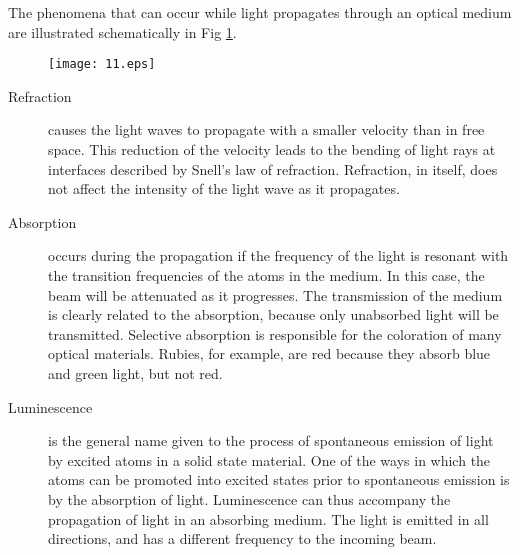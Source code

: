\documentclass[12pt]{book}
\begin{document}
The phenomena that can occur while light propagates through an optical medium are illustrated schematically in Fig \ref{fig:sche}.

\begin{figure}[http]
\begin{center}\label{fig:sche}
\texttt{[image: 11.eps]}
\end{center}
\end{figure}
\vspace{-3\baselineskip}


\vspace{2\baselineskip}
\begin{description}
\item[Refraction] causes the light waves to propagate with a smaller velocity than in free space. This reduction of the velocity leads to the bending of light rays at interfaces described by Snell's law of refraction. Refraction, in itself, does not affect the intensity of the light wave as it propagates.
\item[Absorption] occurs during the propagation if the frequency of the light is resonant  with the transition frequencies of the atoms in the medium. In this case, the beam will be attenuated as it progresses. The transmission of the medium is clearly related to the absorption, because only unabsorbed light will be transmitted. Selective absorption is responsible for the coloration of many optical materials. Rubies, for example, are red because they absorb blue and green light, but not red.
\item[Luminescence] is  the general name given to the process of spontaneous emission of light by excited atoms in a solid state material. One of the ways in which the atoms can be promoted into excited states prior to spontaneous emission is by the absorption of light. Luminescence can thus accompany the propagation of light in an absorbing medium. The light is emitted in all directions, and has a different frequency to the incoming beam.


\end{description}
\end{document}
